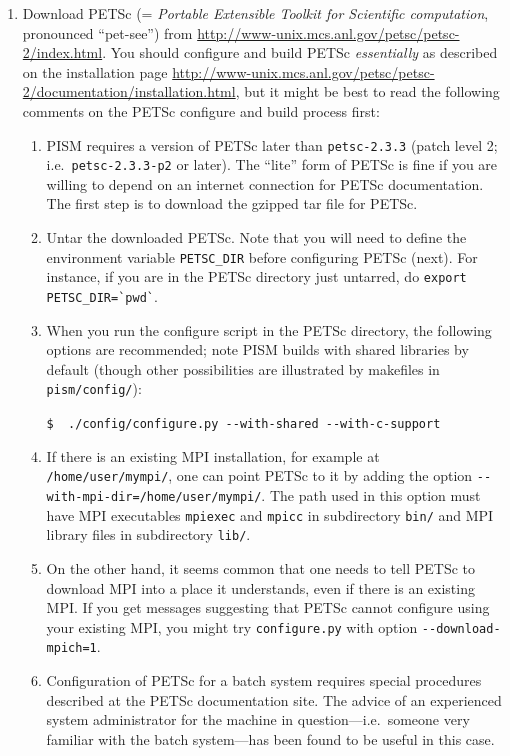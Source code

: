 \documentclass[11pt,final]{amsart}
\begin{document}
\begin{enumerate}
\item Download PETSc (= \emph{Portable Extensible Toolkit for Scientific computation}, pronounced ``pet-see'') from \url{http://www-unix.mcs.anl.gov/petsc/petsc-2/index.html}.  You should configure and build PETSc \emph{essentially} as described on the installation page \url{http://www-unix.mcs.anl.gov/petsc/petsc-2/documentation/installation.html}, but it might be best to read the following comments on the PETSc configure and build process first:

\renewcommand{\labelenumii}{(\roman{enumii})}\begin{enumerate}
\item PISM requires a version of PETSc later than \verb|petsc-2.3.3| (patch level 2; i.e.~\verb|petsc-2.3.3-p2| or later).   The ``lite'' form of PETSc is fine if you are willing to depend on an internet connection for PETSc documentation.  The first step is to download the gzipped tar file for PETSc.

\item Untar the downloaded PETSc.  Note that you will need to define the environment variable \verb|PETSC_DIR| before configuring PETSc (next).  For instance, if you are in the PETSc directory just untarred, do \verb|export PETSC_DIR=`pwd`|.

\item When you run the configure script in the PETSc directory, the following options are recommended; note PISM builds with shared libraries by default (though other possibilities are illustrated by makefiles in \verb|pism/config/|):

\verb|$  ./config/configure.py --with-shared --with-c-support|

\item If there is an existing MPI installation, for example at \verb|/home/user/mympi/|, one can point PETSc to it by adding the option \verb|--with-mpi-dir=/home/user/mympi/|.  The path used in this option must have MPI executables \verb|mpiexec| and \verb|mpicc| in subdirectory \verb|bin/| and MPI library files in subdirectory \verb|lib/|.

\item On the other hand, it seems common that one needs to tell PETSc to download MPI into a place it understands, even if there is an existing MPI.  If you get messages suggesting that PETSc cannot configure using your existing MPI, you might try \verb|configure.py| with option \verb|--download-mpich=1|.

\item Configuration of PETSc for a batch system requires special procedures described at the PETSc documentation site.  The advice of an experienced system administrator for the machine in question---i.e.~someone very familiar with the batch system---has been found to be useful in this case.


\end{enumerate}
\end{enumerate}
\end{document}
